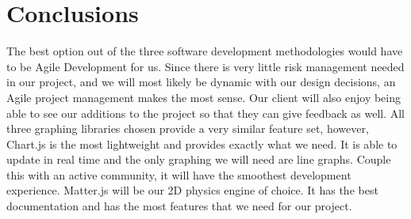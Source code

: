 \documentclass[capstone.tex]{subfiles}
\begin{document}
\section{Conclusions}

The best option out of the three software development methodologies would have to be Agile Development for us. Since there is very little risk management needed in our project, and we will most likely be dynamic with our design decisions, an Agile project management makes the most sense. Our client will also enjoy being able to see our additions to the project so that they can give feedback as well. All three graphing libraries chosen provide a very similar feature set, however, Chart.js is the most lightweight and provides exactly what we need. It is able to update in real time and the only graphing we will need are line graphs. Couple this with an active community, it will have the smoothest development experience. Matter.js will be our 2D physics engine of choice. It has the best documentation and has the most features that we need for our project. 

\newpage
\nocite{*}
\end{document}

